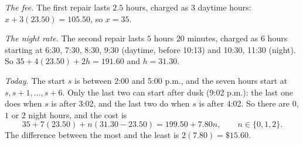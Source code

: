 \emph{The fee.} The first repair lasts $2.5$ hours, charged as $3$ daytime hours: $x+3(23.50)=105.50$, so $x=35$.

\emph{The night rate.} The second repair lasts $5$ hours $20$ minutes, charged as $6$ hours starting at 6:30, 7:30, 8:30, 9:30 (daytime, before 10:13) and 10:30, 11:30 (night). So $35+4(23.50)+2h=191.60$ and $h=31.30$.

\emph{Today.} The start $s$ is between 2:00 and 5:00 p.m., and the seven hours start at $s,s+1,\dots,s+6$. Only the last two can start after dusk (9:02 p.m.): the last one does when $s$ is after 3:02, and the last two do when $s$ is after 4:02. So there are $0$, $1$ or $2$ night hours, and the cost is
\[35+7(23.50)+n(31.30-23.50)=199.50+7.80n,\qquad n\in\{0,1,2\}.\]
The difference between the most and the least is $2(7.80)=\boxed{\$15.60}$.
